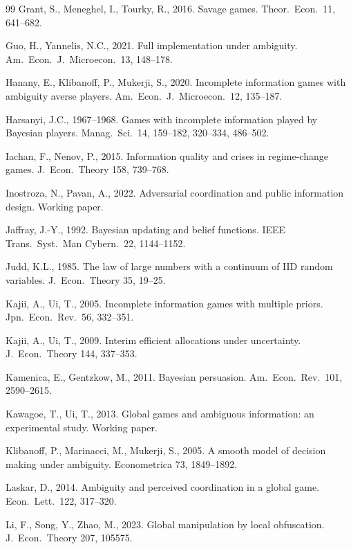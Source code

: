 \documentclass[12pt,a4paper]{article}
\theoremstyle{definition}
\theoremstyle{remark}
\begin{document}
\begin{thebibliography}{99}
Grant, S., Meneghel, I., Tourky, R., 2016. Savage games. Theor.\ Econ.\ 11, 641--682.

Guo, H., Yannelis, N.C., 2021. Full implementation under ambiguity. Am.\ Econ.\ J.\ Microecon.\ 13, 148--178.

Hanany, E., Klibanoff, P., Mukerji, S., 2020. Incomplete information games with ambiguity averse players. Am.\ Econ.\ J.\ Microecon.\ 12, 135--187.

Harsanyi, J.C., 1967--1968. Games with incomplete information played by Bayesian players. Manag.\ Sci.\ 14, 159--182, 320--334, 486--502.

Iachan, F., Nenov, P., 2015. Information quality and crises in regime-change games. J.\ Econ.\ Theory 158, 739--768.

Inostroza, N., Pavan, A., 2022. Adversarial coordination and public information design. Working paper.

Jaffray, J.-Y., 1992. Bayesian updating and belief functions. IEEE Trans.\ Syst.\ Man Cybern.\ 22, 1144--1152.

Judd, K.L., 1985. The law of large numbers with a continuum of IID random variables. J.\ Econ.\ Theory 35, 19--25.

Kajii, A., Ui, T., 2005. Incomplete information games with multiple priors. Jpn.\ Econ.\ Rev.\ 56, 332--351.

Kajii, A., Ui, T., 2009. Interim efficient allocations under uncertainty. J.\ Econ.\ Theory 144, 337--353.

Kamenica, E., Gentzkow, M., 2011. Bayesian persuasion. Am.\ Econ.\ Rev.\ 101, 2590--2615.

Kawagoe, T., Ui, T., 2013. Global games and ambiguous information: an experimental study. Working paper.

Klibanoff, P., Marinacci, M., Mukerji, S., 2005. A smooth model of decision making under ambiguity. Econometrica 73, 1849--1892.

Laskar, D., 2014. Ambiguity and perceived coordination in a global game. Econ.\ Lett.\ 122, 317--320.

Li, F., Song, Y., Zhao, M., 2023. Global manipulation by local obfuscation. J.\ Econ.\ Theory 207, 105575.


\end{thebibliography}
\end{document}
